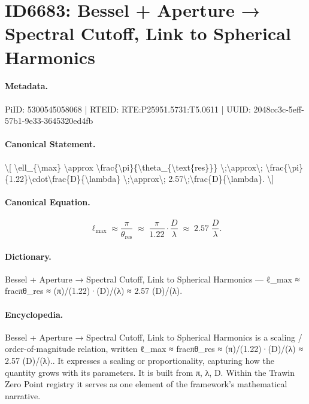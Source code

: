 \section*{ID6683: Bessel + Aperture → Spectral Cutoff, Link to Spherical Harmonics}
\paragraph{Metadata.}
PiID: 5300545058068 | RTEID: RTE:P25951.5731:T5.0611 | UUID: 2048cc3c-5eff-57b1-9e33-3645320ed4fb

\paragraph{Canonical Statement.}
\textbackslash{}[ \textbackslash{}ell\_\{\textbackslash{}max\} \textbackslash{}approx \textbackslash{}frac\{\textbackslash{}pi\}\{\textbackslash{}theta\_\{\textbackslash{}text\{res\}\}\} \textbackslash{};\textbackslash{}approx\textbackslash{}; \textbackslash{}frac\{\textbackslash{}pi\}\{1.22\}\textbackslash{}cdot\textbackslash{}frac\{D\}\{\textbackslash{}lambda\} \textbackslash{};\textbackslash{}approx\textbackslash{}; 2.57\textbackslash{};\textbackslash{}frac\{D\}\{\textbackslash{}lambda\}. \textbackslash{}]

\paragraph{Canonical Equation.}
\[
\ell_{\max} \approx \frac{\pi}{\theta_{\text{res}}} \;\approx\; \frac{\pi}{1.22}\cdot\frac{D}{\lambda} \;\approx\; 2.57\;\frac{D}{\lambda}.
\]

\paragraph{Dictionary.}
Bessel + Aperture → Spectral Cutoff, Link to Spherical Harmonics — ℓ\_max ≈ fracπθ\_res ≈ (π)/(1.22)·(D)/(λ) ≈ 2.57 (D)/(λ).

\paragraph{Encyclopedia.}
Bessel + Aperture → Spectral Cutoff, Link to Spherical Harmonics is a scaling / order-of-magnitude relation, written ℓ\_max ≈ fracπθ\_res ≈ (π)/(1.22)·(D)/(λ) ≈ 2.57 (D)/(λ).. It expresses a scaling or proportionality, capturing how the quantity grows with its parameters. It is built from π, λ, D. Within the Trawin Zero Point registry it serves as one element of the framework's mathematical narrative.
